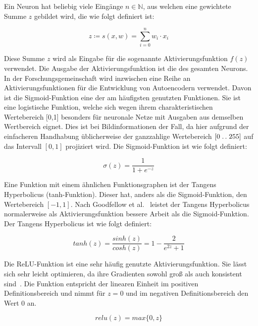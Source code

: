 \pagebreak
Ein Neuron hat beliebig viele Eingänge $n \in \mathbb{N}$, aus welchen eine gewichtete Summe $z$ gebildet wird, die wie folgt definiert ist:

\begin{equation}
    z \coloneq s(x,w) = \sum_{i=0}^n w_i \cdot x_i
\end{equation}


Diese Summe $z$ wird als Eingabe für die sogenannte Aktivierungsfunktion $f(z)$ verwendet. Die Ausgabe der Aktivierungsfunktion ist die des gesamten Neurons. In der Forschungsgemeinschaft wird inzwischen eine Reihe an Aktivierungsfunktionen für die Entwicklung von Autoencodern verwendet. Davon ist die Sigmoid-Funktion eine der am häufigsten genutzten Funktionen. Sie ist eine logistische Funktion, welche sich wegen ihrem charakteristischen Wertebereich [0,1] besonders für neuronale Netze mit Ausgaben aus demselben Wertbereich eignet. Dies ist bei Bildinformationen der Fall, da hier aufgrund der einfacheren Handhabung üblicherweise der ganzzahlige Wertebereich $[0 \mathrel{{.}\,{.}}\nobreak 255]$ auf das Intervall $[0,1]$ projiziert wird. Die Sigmoid-Funktion ist wie folgt definiert:

\begin{equation}
    \sigma (z) = \frac{1}{1+e^{-z}}
\end{equation}

Eine Funktion mit einem ähnlichen Funktionsgraphen ist der Tangens Hyperbolicus (tanh-Funktion). Dieser hat, anders als die Sigmoid-Funktion, den Wertebereich $[-1,1]$. Nach Goodfellow et al.~\cite[S. 215]{goodfellowDeepLearningUmfassende2018} leistet der Tangens Hyperbolicus normalerweise als Aktivierungsfunktion bessere Arbeit als die Sigmoid-Funktion. Der Tangens Hyperbolicus ist wie folgt definiert:

\begin{equation}
    tanh(z) = \frac{sinh(z)}{cosh(z)} = 1 - \frac{2}{e^{2z}+1}
\end{equation}

Die ReLU-Funktion ist eine sehr häufig genutzte Aktivierungsfunktion. Sie lässt sich sehr leicht optimieren, da ihre Gradienten sowohl groß als auch konsistent sind~\cite[S.~213]{goodfellowDeepLearningUmfassende2018}. Die Funktion entspricht der linearen Einheit im positiven Definitionsbereich und nimmt für $z=0$ und im negativen Definitionsbereich den Wert 0 an.

\begin{equation}
    relu(z) = max\{0, z\}
\end{equation}


